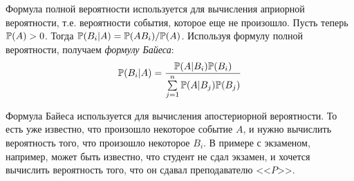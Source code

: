 \documentclass[../TV&MS.tex]{subfiles}
\begin{document}
Формула полной вероятности используется для вычисления априорной вероятности, т.е. вероятности 
события, которое  еще не произошло. Пусть теперь $\mathbb{P}(A) > 0$. Тогда 
$\mathbb{P}(B_i|A)=\mathbb{P}(AB_i)/\mathbb{P}(A)$. Используя формулу полной вероятности, 
получаем \emph{формулу Байеса}:
$$\mathbb{P}(B_i|A)=\frac{\mathbb{P}(A|B_i)\mathbb{P}(B_i)}{\sum\limits_{j=1}^n\mathbb{P}(A|B_j)\mathbb{P}(B_j)}$$

Формула Байеса используется для вычисления апостериорной вероятности. То есть уже известно, что произошло некоторое событие $A$, и нужно вычислить вероятность
того, что произошло некоторое $B_i$. В примере с экзаменом, например, может быть известно, что студент не сдал экзамен, и хочется вычислить вероятность того, что он
сдавал преподавателю <<$P$>>.

\newpage
\end{document}
